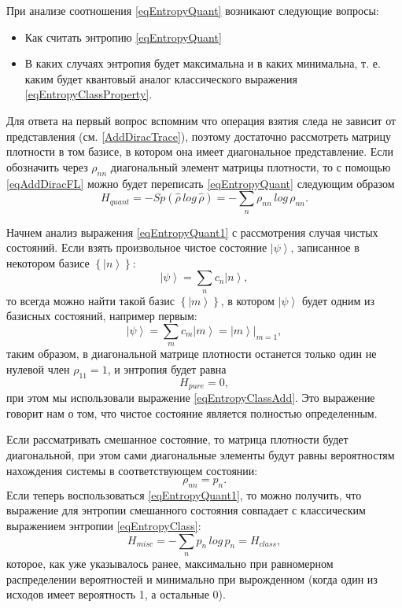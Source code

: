 При анализе соотношения \eqref{eqEntropyQuant} возникают следующие
вопросы:
\begin{itemize}
\item Как считать энтропию \eqref{eqEntropyQuant}
\item В каких случаях энтропия будет максимальна и в каких минимальна,
  т. е. каким будет квантовый аналог классического выражения
  \ref{eqEntropyClassProperty}. 
\end{itemize}

Для ответа на первый вопрос вспомним что операция взятия следа не
зависит от представления (см. \autoref{AddDiracTrace}), поэтому
достаточно рассмотреть матрицу плотности в том базисе, в котором она имеет
диагональное представление. Если обозначить через $\rho_{nn}$
диагональный элемент матрицы плотности, то с помощью \eqref{eqAddDiracFL}
можно будет переписать \eqref{eqEntropyQuant} следующим образом
\begin{equation}
H_{quant} = - Sp \left(\hat{\rho} \, log \, \hat{\rho}\right) = 
- \sum_n \rho_{nn} \, log \, \rho_{nn}.
\label{eqEntropyQuant1}
\end{equation}

Начнем анализ выражения \eqref{eqEntropyQuant1} с рассмотрения случая чистых состояний.
Если взять произвольное чистое состояние $\left|\psi\right>$,
записанное в некотором базисе $\left\{\left|n\right>\right\}$:
\[
\left|\psi\right> = \sum_n c_n \left|n\right>,
\]
то всегда можно найти такой базис $\left\{\left|m\right>\right\}$, в
котором $\left|\psi\right>$ будет одним из базисных состояний, например первым: 
\[
\left|\psi\right> = \sum_m c_m \left|m\right> = 
\left.\left|m\right>\right|_{m = 1},
\]
таким образом, в диагональной матрице плотности останется только один
не нулевой член $\rho_{11} = 1$, и энтропия будет равна
\begin{equation}
H_{pure} = 0,
\label{eqQIEntropyPure}
\end{equation}
при этом мы использовали выражение \eqref{eqEntropyClassAdd}. Это
выражение говорит нам о том, что чистое состояние является полностью
определенным. 

Если рассматривать смешанное состояние, то матрица плотности 
будет
диагональной, при этом сами диагональные элементы будут равны
вероятностям нахождения системы в соответствующем состоянии:
\[
\rho_{nn} = p_n.
\]
Если теперь воспользоваться \eqref{eqEntropyQuant1}, то можно получить,
что выражение для энтропии смешанного состояния совпадает с
классическим выражением энтропии \eqref{eqEntropyClass}:
\begin{equation}
H_{misc} = - \sum_n p_n \, log \, p_n = H_{class},
\label{eqQIEntropyMisc}
\end{equation}
которое, как уже указывалось ранее, максимально при равномерном распределении
вероятностей и минимально при вырожденном (когда один из исходов имеет
вероятность 1, а остальные 0).

